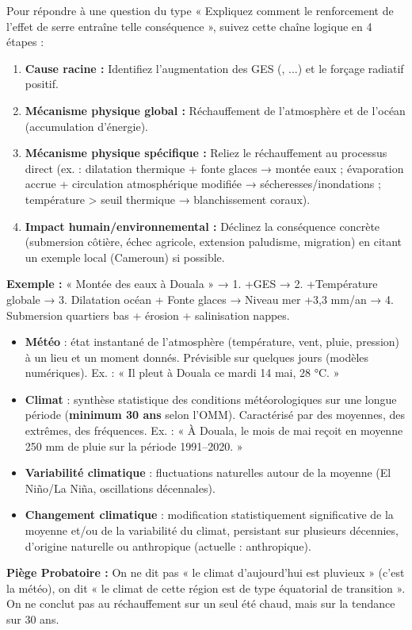 \documentclass[11pt]{article}
\begin{document}
\begin{methode}
Pour répondre à une question du type « Expliquez comment le renforcement de l'effet de serre entraîne telle conséquence », suivez cette chaîne logique en 4 étapes :
\begin{enumerate}
    \item \textbf{Cause racine :} Identifiez l'augmentation des GES (, ...) et le forçage radiatif positif.
    \item \textbf{Mécanisme physique global :} Réchauffement de l'atmosphère et de l'océan (accumulation d'énergie).
    \item \textbf{Mécanisme physique spécifique :} Reliez le réchauffement au processus direct (ex. : dilatation thermique + fonte glaces → montée eaux ; évaporation accrue + circulation atmosphérique modifiée → sécheresses/inondations ; température > seuil thermique → blanchissement coraux).
    \item \textbf{Impact humain/environnemental :} Déclinez la conséquence concrète (submersion côtière, échec agricole, extension paludisme, migration) en citant un exemple local (Cameroun) si possible.
\end{enumerate}
\textbf{Exemple :} « Montée des eaux à Douala » → 1. +GES → 2. +Température globale → 3. Dilatation océan + Fonte glaces → Niveau mer +3,3 mm/an → 4. Submersion quartiers bas + érosion + salinisation nappes.
\end{methode}

\begin{aretenir}
\begin{itemize}
    \item \textbf{Météo} : état instantané de l'atmosphère (température, vent, pluie, pression) à un lieu et un moment donnés. Prévisible sur quelques jours (modèles numériques). Ex. : « Il pleut à Douala ce mardi 14 mai, 28 °C. »
    \item \textbf{Climat} : synthèse statistique des conditions météorologiques sur une longue période (\textbf{minimum 30 ans} selon l'OMM). Caractérisé par des moyennes, des extrêmes, des fréquences. Ex. : « À Douala, le mois de mai reçoit en moyenne 250 mm de pluie sur la période 1991--2020. »
    \item \textbf{Variabilité climatique} : fluctuations naturelles autour de la moyenne (El Niño/La Niña, oscillations décennales).
    \item \textbf{Changement climatique} : modification statistiquement significative de la moyenne et/ou de la variabilité du climat, persistant sur plusieurs décennies, d'origine naturelle ou anthropique (actuelle : anthropique).
\end{itemize}
\textbf{Piège Probatoire :} On ne dit pas « le climat d'aujourd'hui est pluvieux » (c'est la météo), on dit « le climat de cette région est de type équatorial de transition ». On ne conclut pas au réchauffement sur un seul été chaud, mais sur la tendance sur 30 ans.
\end{aretenir}
\end{document}
